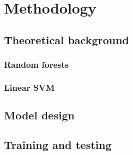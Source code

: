 \section{Methodology}
\subsection{Theoretical background}
\subsubsection{Random forests}
\subsubsection{Linear SVM}
\subsection{Model design}
\subsection{Training and testing}



